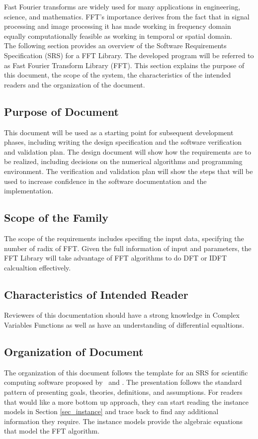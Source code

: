 \documentclass[12pt]{article}
\newcommand{\famname}{FFT} %
\begin{document}
Fast Fourier transforms are widely used for many applications in engineering, science, and mathematics. FFT's importance derives from the fact that in signal processing and image processing it has made working in frequency domain equally computationally feasible as working in temporal or spatial domain. \\

The following section provides an overview of the Software Requirements
Specification (SRS) for a FFT Library.  The
developed program will be referred to as Fast Fourier Transform Library
(\famname{}).  This section explains the purpose of this document, the scope of
the system, the characteristics of the intended readers and the organization of
the document.

\subsection{Purpose of Document}

This document will be  used as a starting point for subsequent development phases, including writing the design specification and the software verification and validation plan.
The design document will show how the requirements are to be realized, including decisions on the numerical algorithms and programming environment.
The verification and validation plan will show the steps that will be used to increase confidence in the software documentation and the implementation.


\subsection{Scope of the Family} 

The scope of the requirements includes specifing the input data, specifying the number of radix of FFT. Given the full information of input and parameters, the FFT Library will
take advantage of FFT algorithms to do DFT or IDFT calcualtion effectively.


\subsection{Characteristics of Intended Reader} 

Reviewers of this documentation should have a  strong knowledge in Complex Variables Functions as well as have an understanding of differential equaltions. 

\subsection{Organization of Document}
The organization of this document follows the template for an SRS for scientific
computing software proposed by~\cite{Koothoor2013} and \cite{SmithAndLai2005}.
The presentation follows the standard pattern of presenting goals, theories,
definitions, and assumptions.  For readers that would like a more bottom up
approach, they can start reading the instance models in Section
\ref{sec_instance} and trace back to find any additional information they
require.  The instance models provide the algebraic equations that model the FFT algorithm.
\end{document}
